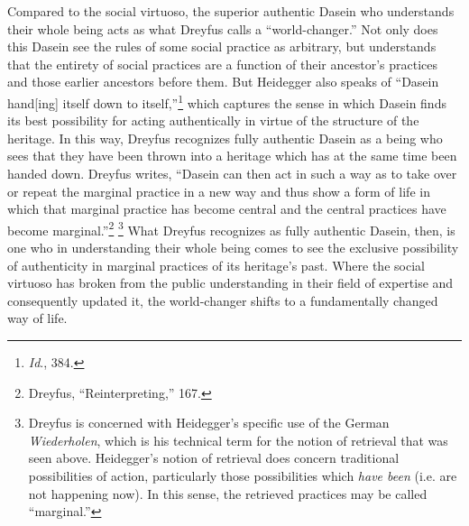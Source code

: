 Compared to the social virtuoso, the superior authentic Dasein who
understands their whole being acts as what Dreyfus calls a
``world-changer.'' Not only does this Dasein see the rules of some
social practice as arbitrary, but understands that the entirety of
social practices are a function of their ancestor's practices and those
earlier ancestors before them. But Heidegger also speaks of ``Dasein
hand{[}ing{]} itself down to itself,''\footnote{\emph{Id}., 384.} which
captures the sense in which Dasein finds its best possibility for acting
authentically in virtue of the structure of the heritage. In this way,
Dreyfus recognizes fully authentic Dasein as a being who sees that they
have been thrown into a heritage which has at the same time been handed
down. Dreyfus writes, ``Dasein can then act in such a way as to take
over or repeat the marginal practice in a new way and thus show a form
of life in which that marginal practice has become central and the
central practices have become marginal.''\footnote{Dreyfus,
  ``Reinterpreting,'' 167.} \footnote{Dreyfus is concerned with
  Heidegger's specific use of the German \emph{Wiederholen}, which is
  his technical term for the notion of retrieval that was seen above.
  Heidegger's notion of retrieval does concern traditional possibilities
  of action, particularly those possibilities which \emph{have been}
  (i.e. are not happening now). In this sense, the retrieved practices
  may be called ``marginal.''} What Dreyfus recognizes as fully
authentic Dasein, then, is one who in understanding their whole being
comes to see the exclusive possibility of authenticity in marginal
practices of its heritage's past. Where the social virtuoso has broken
from the public understanding in their field of expertise and
consequently updated it, the world-changer shifts to a fundamentally
changed way of life.

